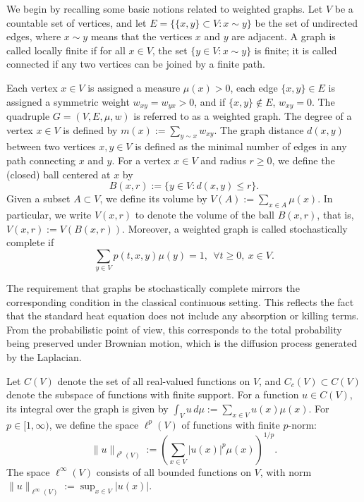 \documentclass[reqno,12pt]{amsart}
\numberwithin{equation}{section}
\begin{document}
	We begin by recalling some basic notions related to weighted graphs. Let \( V \) be a countable set of vertices, and let \( E = \{ \{x, y\} \subset V : x \sim y \} \) be the set of undirected edges, where \( x \sim y \) means that the vertices \( x \) and \( y \) are adjacent. A graph is called locally finite if for all \( x \in V \), the set \( \{ y \in V : x \sim y \} \) is finite; it is called connected if any two vertices can be joined by a finite path. 
	
	Each vertex \( x \in V \) is assigned a measure \( \mu(x) > 0 \), each edge \( \{x, y\} \in E \) is assigned a symmetric weight \( w_{xy} = w_{yx} > 0 \), and if  \( \{x, y\} \notin E \), $w_{xy}=0.$ The quadruple \( G = (V, E, \mu, w) \) is referred to as a weighted graph. The degree of a vertex \( x \in V \) is defined by $	m(x) := \sum_{y \sim x} w_{xy}.$
	The graph distance \( d(x, y) \) between two vertices \( x, y \in V \) is defined as the minimal number of edges in any path connecting \( x \) and \( y \). For a vertex $x \in V$ and radius $r \ge 0$, we define the (closed) ball centered at $x$ by
	\[
	B(x, r) := \{ y \in V : d(x, y) \le r \}.
	\]
	Given a subset $A \subset V$, we define its volume by $V(A) := \sum_{x \in A} \mu(x).$
	In particular, we write $V(x, r)$ to denote the volume of the ball $B(x, r)$, that is, $	V(x, r) := V(B(x, r)).$
	Moreover, a weighted graph is called stochastically complete \cite{wojciechowski2008stochastic,hua2017stochastic,folz2014volume} if 
	\[\sum_{y\in V}p\left(t,x,y\right)\mu\left(y\right)=1,\:\:\forall t\ge 0,\:x\in V.\]
	
The requirement that graphs be stochastically complete mirrors the corresponding condition in the classical continuous setting. This reflects the fact that the standard heat equation does not include any absorption or killing terms. From the probabilistic point of view, this corresponds to the total probability being preserved under Brownian motion, which is the diffusion process generated by the Laplacian.
	
	
	Let \( C(V) \) denote the set of all real-valued functions on \( V \), and \( C_c(V) \subset C(V) \) denote the subspace of functions with finite support. For a function \( u \in C(V) \), its integral over the graph is given by $	\int_V u\, d\mu := \sum_{x \in V} u(x)\mu(x).$
	For \( p \in [1, \infty) \), we define the space \( \ell^p(V) \) of functions with finite \( p \)-norm:
	\[
	\|u\|_{\ell^p(V)} := \left( \sum_{x \in V} |u(x)|^p \mu(x) \right)^{1/p}.
	\]
	The space \( \ell^\infty(V) \) consists of all bounded functions on \( V \), with norm $\|u\|_{\ell^\infty(V)} := \sup_{x \in V} |u(x)|.$
\end{document}
